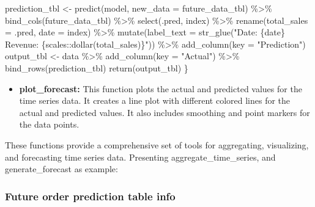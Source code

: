 \documentclass[
  11pt,
]{article}
\newenvironment{Shaded}{\begin{snugshade}}{\end{snugshade}}
\newcommand{\AttributeTok}[1]{\textcolor[rgb]{0.40,0.45,0.13}{#1}}
\newcommand{\FunctionTok}[1]{\textcolor[rgb]{0.28,0.35,0.67}{#1}}
\newcommand{\NormalTok}[1]{\textcolor[rgb]{0.00,0.23,0.31}{#1}}
\newcommand{\OtherTok}[1]{\textcolor[rgb]{0.00,0.23,0.31}{#1}}
\newcommand{\SpecialCharTok}[1]{\textcolor[rgb]{0.37,0.37,0.37}{#1}}
\newcommand{\StringTok}[1]{\textcolor[rgb]{0.13,0.47,0.30}{#1}}
\providecommand{\tightlist}{%
  \setlength{\itemsep}{0pt}\setlength{\parskip}{0pt}}\usepackage{longtable,booktabs,array}
\begin{document}
\begin{Shaded}
\begin{Highlighting}[]
\NormalTok{  prediction\_tbl }\OtherTok{\textless{}{-}} \FunctionTok{predict}\NormalTok{(model, }\AttributeTok{new\_data =}\NormalTok{ future\_data\_tbl) }\SpecialCharTok{\%\textgreater{}\%}
    \FunctionTok{bind\_cols}\NormalTok{(future\_data\_tbl) }\SpecialCharTok{\%\textgreater{}\%}
    \FunctionTok{select}\NormalTok{(.pred, index) }\SpecialCharTok{\%\textgreater{}\%}
    \FunctionTok{rename}\NormalTok{(}\AttributeTok{total\_sales =}\NormalTok{ .pred,}
           \AttributeTok{date        =}\NormalTok{ index) }\SpecialCharTok{\%\textgreater{}\%}
    \FunctionTok{mutate}\NormalTok{(}\AttributeTok{label\_text =} \FunctionTok{str\_glue}\NormalTok{(}\StringTok{"Date: \{date\}}
\StringTok{                                 Revenue: \{scales::dollar(total\_sales)\}"}\NormalTok{)) }\SpecialCharTok{\%\textgreater{}\%}
    \FunctionTok{add\_column}\NormalTok{(}\AttributeTok{key =} \StringTok{"Prediction"}\NormalTok{)}
\NormalTok{  output\_tbl }\OtherTok{\textless{}{-}}\NormalTok{ data }\SpecialCharTok{\%\textgreater{}\%}
    \FunctionTok{add\_column}\NormalTok{(}\AttributeTok{key =} \StringTok{"Actual"}\NormalTok{) }\SpecialCharTok{\%\textgreater{}\%}
    \FunctionTok{bind\_rows}\NormalTok{(prediction\_tbl)}
  \FunctionTok{return}\NormalTok{(output\_tbl)}
\NormalTok{\}}
\end{Highlighting}
\end{Shaded}

\begin{itemize}
\tightlist
\item
  \textbf{plot\_forecast:} This function plots the actual and predicted
  values for the time series data. It creates a line plot with different
  colored lines for the actual and predicted values. It also includes
  smoothing and point markers for the data points.
\end{itemize}

These functions provide a comprehensive set of tools for aggregating,
visualizing, and forecasting time series data. Presenting
aggregate\_time\_series, and generate\_forecast as example:

\hypertarget{future-order-prediction-table-info}{%
\subsubsection{Future order prediction table
info}\label{future-order-prediction-table-info}}
\end{document}
